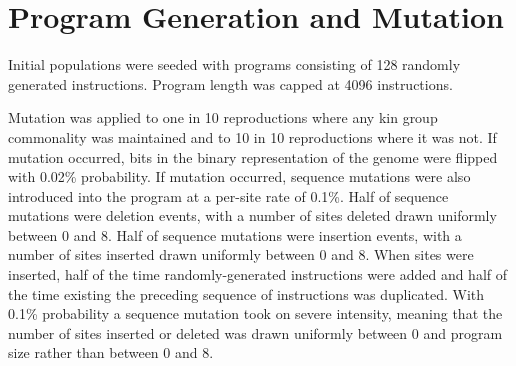 \section{Program Generation and Mutation}

Initial populations were seeded with programs consisting of 128 randomly generated instructions.
Program length was capped at 4096 instructions.

Mutation was applied to one in 10 reproductions where any kin group commonality was maintained and to 10 in 10 reproductions where it was not.
If mutation occurred, bits in the binary representation of the genome were flipped with 0.02\% probability.
If mutation occurred, sequence mutations were also introduced into the program at a per-site rate of 0.1\%.
Half of sequence mutations were deletion events, with a number of sites deleted drawn uniformly between 0 and 8.
Half of sequence mutations were insertion events, with a number of sites inserted drawn uniformly between 0 and 8.
When sites were inserted, half of the time randomly-generated instructions were added and half of the time existing the preceding sequence of instructions was duplicated.
With 0.1\% probability a sequence mutation took on severe intensity, meaning that the number of sites inserted or deleted was drawn uniformly between 0 and program size rather than between 0 and 8.
